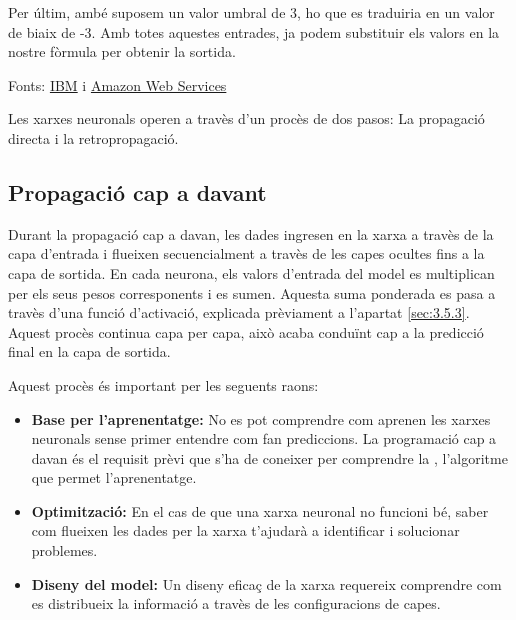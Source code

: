 Per últim, ambé suposem un valor umbral de 3, ho que es traduiria en un valor de biaix de -3. Amb totes aquestes entrades, ja podem substituir els valors en la nostre fòrmula per obtenir la sortida.

Fonts: \href{https://www.ibm.com/es-es/think/topics/neural-networks}{IBM} i \href{https://aws.amazon.com/es/what-is/neural-network/}{Amazon Web Services}

Les xarxes neuronals operen a travès d'un procès de dos pasos: La propagació directa i la retropropagació.

\subsection{Propagació cap a davant}\label{subsec:propagació}
Durant la propagació cap a davan, les dades ingresen en la xarxa a travès de la capa d'entrada i flueixen secuencialment a travès de les capes ocultes fins a la capa de sortida. En cada neurona, els valors d'entrada del model es multiplican per els seus pesos corresponents i es sumen. Aquesta suma ponderada es pasa a travès d'una funció d'activació, explicada prèviament a l'apartat \ref{sec:3.5.3}. Aquest procès continua capa per capa, això acaba conduïnt cap a la predicció final en la capa de sortida.

Aquest procès és important per les seguents raons:
\begin{itemize}
 \item \textbf{Base per l'aprenentatge:} No es pot comprendre com aprenen les xarxes neuronals sense primer entendre com fan prediccions. La programació cap a davan és el requisit prèvi que s'ha de coneixer per comprendre la , l'algoritme que permet l'aprenentatge.
 \item \textbf{Optimització:} En el cas de que una xarxa neuronal no funcioni bé, saber com flueixen les dades per la xarxa t'ajudarà a identificar i solucionar problemes.
 \item \textbf{Diseny del model:} Un diseny eficaç de la xarxa requereix comprendre com es distribueix la informació a travès de les configuracions de capes.
\end{itemize}

